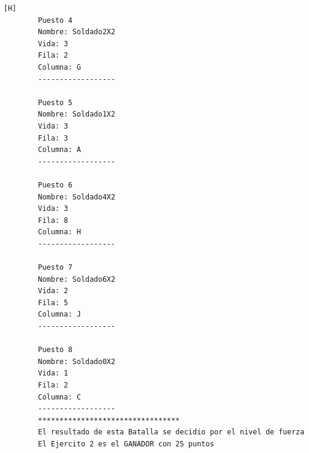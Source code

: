 \documentclass{article}
\begin{document}
\begin{lstlisting}[language=bash,caption={La ejecución: \textcolor{red}{PARA PODER VER LA TABLA COMPLETAMENTE MIRAR LA PLANTILLA DE LATEX O EJECUTARLO: }}][H]
		Puesto 4
		Nombre: Soldado2X2
		Vida: 3
		Fila: 2
		Columna: G
		------------------
		
		Puesto 5
		Nombre: Soldado1X2
		Vida: 3
		Fila: 3
		Columna: A
		------------------
		
		Puesto 6
		Nombre: Soldado4X2
		Vida: 3
		Fila: 8
		Columna: H
		------------------
		
		Puesto 7
		Nombre: Soldado6X2
		Vida: 2
		Fila: 5
		Columna: J
		------------------
		
		Puesto 8
		Nombre: Soldado0X2
		Vida: 1
		Fila: 2
		Columna: C
		------------------
		*********************************
		El resultado de esta Batalla se decidio por el nivel de fuerza de cada ejercito por lo que el resultado es: ...
		El Ejercito 2 es el GANADOR con 25 puntos

	\end{lstlisting}
\end{document}
